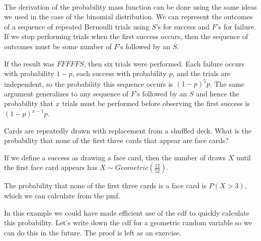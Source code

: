 \begin{center}
 \ \ \  
\end{center}
\par
The derivation of the probability mass function can be done using the same ideas we used in the case of the binomial distribution. We can represent the outcomes of a sequence of repeated Bernoulli trials using $S$'s for success and $F$'s for failure. If we stop performing trials when the first success occurs, then the sequence of outcomes must be some number of $F$'s followed by an $S$.
\par
If the result was $FFFFFS$, then six trials were performed. Each failure occurs with probability $1-p$, each success with probability $p$, and the trials are independent, so the probability this sequence occurs is $(1-p)^5p$. The same argument generalizes to any sequence of $F$'s followed by an $S$ and hence the probability that $x$ trials must be performed before observing the first success is $(1-p)^{x-1}p$.
\par
\begin{examp}\label{GeoCards}Cards are repeatedly drawn with replacement from a shuffled deck. What is the probability that none of the first three cards that appear are face cards?
\par
\noindent If we define a success as drawing a face card, then the number of draws $X$ until the first face card appears has $X \sim Geometric(\frac{12}{52})$.
\par
\noindent
The probability that none of the first three cards is a face card is $P(X > 3)$, which we can calculate from the pmf.
\end{examp}
\par
In this example we could have made efficient use of the cdf to quickly calculate this probability. Let's write down the cdf for a geometric random variable so we can do this in the future. The proof is left as an exercise.

